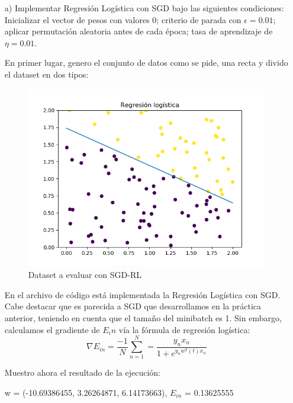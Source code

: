 \begin{itemize}
	\item[a)] Implementar Regresión Logística con SGD bajo las siguientes condiciones: Inicializar el vector de pesos con valores 0; criterio de parada con $\epsilon = 0.01$; aplicar permutación aleatoria antes de cada época; tasa de aprendizaje de $\eta = 0.01$.
	
	En primer lugar, genero el conjunto de datos como se pide, una recta y divido el dataset en dos tipos:
	
	\begin{figure}[H] %
		\centering
		\includegraphics[scale=0.6]{reg-log.png}  %
		\caption{Dataset a evaluar con SGD-RL} 
		\label{fig:reg-log}
	\end{figure}
	
	
	En el archivo de código está implementada la Regresión Logística con SGD. Cabe destacar que es parecida a SGD que desarrollamos en la práctica anterior, teniendo en cuenta que el tamaño del minibatch es 1. Sin embargo, calculamos el gradiente de $E_in$ vía la fórmula de regresión logística:
	$$\nabla E_{in} = \frac{-1}{N} \sum_{n=1}^{N} = \frac{y_n x_n}{1+ e^{y_n w^T(t)x_n}}$$
	
	Muestro ahora el resultado de la ejecución:
	
	w = (-10.69386455, 3.26264871, 6.14173663), $E_{in}$ = 0.13625555
	

\end{itemize}
